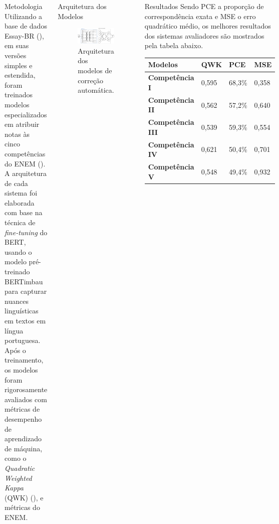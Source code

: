 \documentclass[
  xcolor={hyperref,svgnames,x11names,table},
  hyperref={pdfencoding=unicode,plainpages=false,pdfpagelabels=true,breaklinks=true},
  brazilian,english,
]{beamer}
\newcommand\halfcol{\column{.46\textwidth}}
\begin{document}
\begin{frame}[fragile]
\begin{columns}[T]
    \halfcol

    \begin{block}{Metodologia}
        Utilizando a base de dados Essay-BR (\cite{marinho-et-al-22}), em suas versões simples e estendida, foram treinados modelos especializados em atribuir notas às cinco competências do ENEM (\cite{cartilha-redacao}). A arquitetura de cada sistema foi elaborada com base na técnica de \textit{fine-tuning} do BERT, usando o modelo pré-treinado BERTimbau para capturar nuances linguísticas em textos em língua portuguesa. Após o treinamento, os modelos foram rigorosamente avaliados com métricas de desempenho de aprendizado de máquina, como o \textit{Quadratic Weighted Kappa} (QWK) (\cite{cohen-1968-qwk}), e métricas do ENEM.
    \end{block}

    \begin{block}{Arquitetura dos Modelos}
        \begin{figure}[H]
            \centering
            \includegraphics{figuras/full_architecture.pdf}
            \caption{Arquitetura dos modelos de correção automática.}
            \label{fig:arquitetura}
        \end{figure}
    \end{block}

    \begin{block}{Resultados}
        Sendo PCE a proporção de correspondência exata e MSE o erro quadrático médio, os melhores resultados dos sistemas avaliadores são mostrados pela tabela abaixo.
        \begin{table}[H]
            \small
            \centering
            \begin{tabular}{llll}
                \toprule
                \textbf{Modelos} & QWK & PCE & MSE \\
                \midrule
                \textbf{Competência I} & 0,595 & 68,3\% & 0,358 \\
                \textbf{Competência II} & 0,562 & 57,2\% & 0,640 \\
                \textbf{Competência III} & 0,539 & 59,3\% & 0,554 \\
                \textbf{Competência IV} & 0,621 & 50,4\% & 0,701 \\
                \textbf{Competência V} & 0,548 & 49,4\% & 0,932 \\
                \bottomrule
            \end{tabular}
        \end{table}
    \end{block}


\end{columns}
\end{frame}
\end{document}
